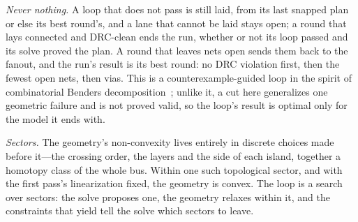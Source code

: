 \documentclass[journal]{IEEEtran}
\begin{document}
\emph{Never nothing.} A loop that does not pass is still laid, from its last snapped plan or else its best round's, and a lane that cannot be laid stays open; a round that lays connected and DRC-clean ends the run, whether or not its loop passed and its solve proved the plan. A round that leaves nets open sends them back to the fanout, and the run's result is its best round: no DRC violation first, then the fewest open nets, then vias. This is a counterexample-guided loop in the spirit of combinatorial Benders decomposition~\cite{hooker2003,codato2006}; unlike it, a cut here generalizes one geometric failure and is not proved valid, so the loop's result is optimal only for the model it ends with.

\emph{Sectors.} The geometry's non-convexity lives entirely in discrete choices made before it---the crossing order, the layers and the side of each island, together a homotopy class of the whole bus. Within one such topological sector, and with the first pass's linearization fixed, the geometry is convex. The loop is a search over sectors: the solve proposes one, the geometry relaxes within it, and the constraints that yield tell the solve which sectors to leave.
\end{document}
